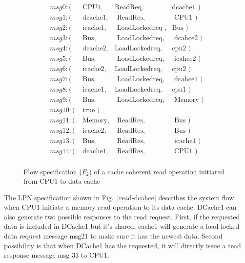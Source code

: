 \documentclass[conference]{IEEEtran}
\begin{document}
\begin{figure}
 {\footnotesize
 \[
 \begin{array}{llll}
 msg0: (&\mbox{ CPU1},&\mbox{ReadReq},&\mbox{dcache1  })\\                   
 msg1: (&\mbox{ dcache1},&\mbox{ ReadRes},&\mbox{ CPU1 })\\
 msg2: (&\mbox{ icache1},&\mbox{ LoadLockedreq },&\mbox{Bus })\\     
 msg3: (&\mbox{ Bus},&\mbox{ LoadLockedreq},&\mbox{ dcahce2     })\\
 msg4: (&\mbox{ dcache2},&\mbox{LoadLockedreq},&\mbox{cpu2 })\\
 msg5: (&\mbox{ Bus},&\mbox{ LoadLockedreq},&\mbox{ icahce2     })\\ 
 msg6: (&\mbox{ icache2},&\mbox{LoadLockedreq},&\mbox{cpu2     })\\
 msg7: (&\mbox{ Bus},&\mbox{ LoadLockedreq},&\mbox{ dcahce1 })\\
 msg8: (&\mbox{ icache1},&\mbox{LoadLockedreq},&\mbox{cpu1       })\\
 msg9: (&\mbox{ Bus},&\mbox{ LoadLockedreq},&\mbox{ Memory     })\\
 msg10: (&\mbox{ true })\\
 msg11: (&\mbox{ Memory},&\mbox{ ReadRes},&\mbox{ Bus       })\\     
 msg12: (&\mbox{ icache2},&\mbox{ ReadRes},&\mbox{ Bus    })\\
 msg13: (&\mbox{ Bus},&\mbox{ ReadRes},&\mbox{ icache1 })\\
 msg14: (&\mbox{ dcache1},&\mbox{ ReadRes},&\mbox{ CPU1 })\\
 \end{array}
 \]}
 \caption{Flow specification ($F_2$) of a cache coherent read operation initiated from CPU1 to  data cache}
 \label{read-dcache}
 
 \end{figure}


The LPN specification shown in Fig.~\ref{read-dcahce} describes the system flow when CPU1 initiate a memory read operation to its data cache. DCache1 can also generate two possible responses to the read request. First, if the requested data is included in DCache1 but it's shared, cache1 will generate a load locked data request message msg21 to make sure it has the newest data. Second possibility is that when DCache1 has the requested, it will directly issue a read response message msg 33 to CPU1.
\end{document}
